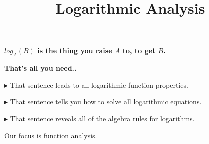\documentclass{ximera}
\title{Logarithmic Analysis}
\begin{document}
\begin{abstract}
\end{abstract}
\maketitle





\begin{center}
\textbf{\textcolor{red!70!black}{$log_A(B)$ is the thing you raise $A$ to, to get $B$.}}
\end{center}






\begin{center}
\textbf{\textcolor{blue!55!black}{That's all you need..}}
\end{center}





\textbf{\textcolor{red!70!darkgray}{$\blacktriangleright$}} That sentence leads to all logarithmic function properties. 

\textbf{\textcolor{red!70!darkgray}{$\blacktriangleright$}} That sentence tells you how to solve all logarithmic equations. 

\textbf{\textcolor{red!70!darkgray}{$\blacktriangleright$}} That sentence reveals all of the algebra rules for logarithms. 





Our focus is function analysis.
\end{document}
